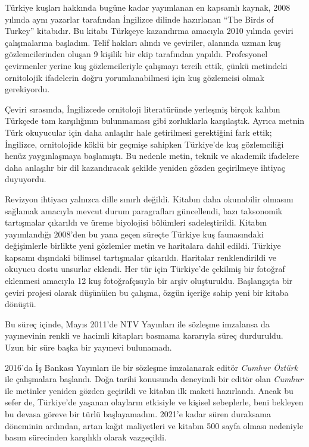 \documentclass[
  a4paper,
  DIV=11,
  numbers=noendperiod]{scrreprt}
\begin{document}

Türkiye kuşları hakkında bugüne kadar yayımlanan en kapsamlı kaynak,
2008 yılında aynı yazarlar tarafından İngilizce dilinde hazırlanan ``The
Birds of Turkey'' kitabıdır. Bu kitabı Türkçeye kazandırma amacıyla 2010
yılında çeviri çalışmalarına başladım. Telif hakları alındı ve
çeviriler, alanında uzman kuş gözlemcilerinden oluşan 9 kişilik bir ekip
tarafından yapıldı. Profesyonel çevirmenler yerine kuş gözlemcileriyle
çalışmayı tercih ettik, çünkü metindeki ornitolojik ifadelerin doğru
yorumlanabilmesi için kuş gözlemcisi olmak gerekiyordu.

Çeviri sırasında, İngilizcede ornitoloji literatüründe yerleşmiş birçok
kalıbın Türkçede tam karşılığının bulunmaması gibi zorluklarla
karşılaştık. Ayrıca metnin Türk okuyucular için daha anlaşılır hale
getirilmesi gerektiğini fark ettik; İngilizce, ornitolojide köklü bir
geçmişe sahipken Türkiye'de kuş gözlemciliği henüz yaygınlaşmaya
başlamıştı. Bu nedenle metin, teknik ve akademik ifadelere daha
anlaşılır bir dil kazandıracak şekilde yeniden gözden geçirilmeye
ihtiyaç duyuyordu.

Revizyon ihtiyacı yalnızca dille sınırlı değildi. Kitabın daha
okunabilir olmasını sağlamak amacıyla mevcut durum paragrafları
güncellendi, bazı taksonomik tartışmalar çıkarıldı ve üreme biyolojisi
bölümleri sadeleştirildi. Kitabın yayımlandığı 2008'den bu yana geçen
süreçte Türkiye kuş faunasındaki değişimlerle birlikte yeni gözlemler
metin ve haritalara dahil edildi. Türkiye kapsamı dışındaki bilimsel
tartışmalar çıkarıldı. Haritalar renklendirildi ve okuyucu dostu
unsurlar eklendi. Her tür için Türkiye'de çekilmiş bir fotoğraf
eklenmesi amacıyla 12 kuş fotoğrafçısıyla bir arşiv oluşturuldu.
Başlangıçta bir çeviri projesi olarak düşünülen bu çalışma, özgün
içeriğe sahip yeni bir kitaba dönüştü.

Bu süreç içinde, Mayıs 2011'de NTV Yayınları ile sözleşme imzalansa da
yayınevinin renkli ve hacimli kitapları basmama kararıyla süreç
durduruldu. Uzun bir süre başka bir yayınevi bulunamadı.

2016'da İş Bankası Yayınları ile bir sözleşme imzalanarak editör
\emph{Cumhur Öztürk} ile çalışmalara başlandı. Doğa tarihi konusunda
deneyimli bir editör olan \emph{Cumhur} ile metinler yeniden gözden
geçirildi ve kitabın ilk maketi hazırlandı. Ancak bu sefer de,
Türkiye'de yaşanan olayların etkisiyle ve kişisel sebeplerle, beni
bekleyen bu devasa göreve bir türlü başlayamadım. 2021'e kadar süren
duraksama döneminin ardından, artan kağıt maliyetleri ve kitabın 500
sayfa olması nedeniyle basım sürecinden karşılıklı olarak vazgeçildi.
\end{document}
